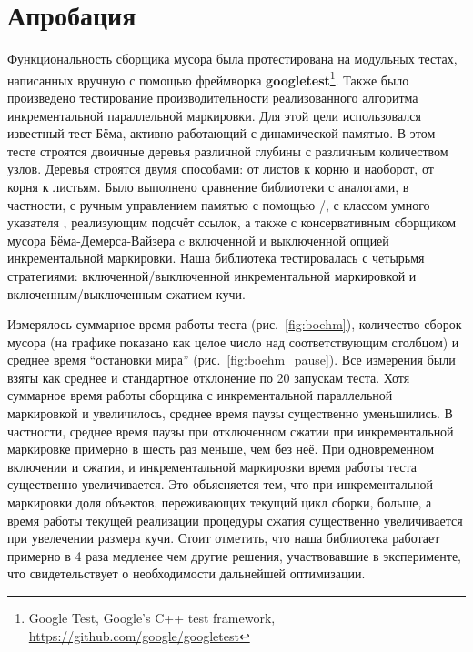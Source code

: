 \section{Апробация}

Функциональность сборщика мусора была протестирована на модульных тестах, 
написанных вручную с помощью фреймворка \textbf{googletest}\footnote{Google Test, Google's C++ test framework,\\ 
\url{https://github.com/google/googletest}}. 
Также было произведено тестирование производительности реализованного алгоритма 
инкрементальной параллельной маркировки. 
Для этой цели использовался известный тест Бёма, активно работающий с динамической памятью. 
В этом тесте строятся двоичные деревья различной глубины с различным количеством узлов. 
Деревья строятся двумя способами: от листов к корню и наоборот, от корня к листьям. 
Было выполнено сравнение библиотеки с аналогами, в частности, с ручным управлением памятью 
с помощью /, с классом умного указателя , 
реализующим подсчёт ссылок, а также с консервативным сборщиком мусора Бёма-Демерса-Вайзера 
c включенной и выключенной опцией инкрементальной маркировки. 
Наша библиотека тестировалась с четырьмя стратегиями: включенной/выключенной 
инкрементальной маркировкой и включенным/выключенным сжатием кучи. 

Измерялось суммарное время работы теста (рис.~\ref{fig:boehm}), количество сборок мусора 
(на графике показано как целое число над соответствующим столбцом) и среднее время 
``остановки мира'' (рис.~\ref{fig:boehm_pause}). 
Все измерения были взяты как среднее и стандартное отклонение по 20 запускам теста. 
Хотя суммарное время работы сборщика с инкрементальной параллельной маркировкой и увеличилось, 
среднее время паузы существенно уменьшились. 
В частности, среднее время паузы при отключенном сжатии при инкрементальной маркировке примерно 
в шесть раз меньше, чем без неё. 
При одновременном включении и сжатия, и инкрементальной маркировки время работы теста 
существенно увеличивается. 
Это объясняется тем, что при инкрементальной маркировки доля объектов, переживающих текущий 
цикл сборки, больше, а время работы текущей реализации процедуры сжатия существенно 
увеличивается при увелечении размера кучи. 
Стоит отметить, что наша библиотека работает примерно в 4 раза медленее чем другие решения, 
участвовавшие в эксперименте, что свидетельствует о необходимости дальнейшей оптимизации.

